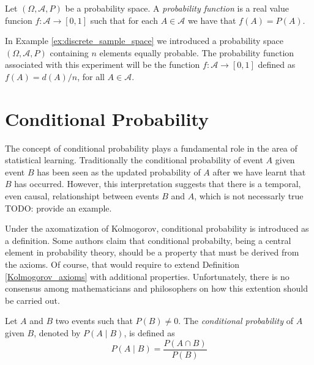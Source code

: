 \begin{definition}
\label{def:probability_function}
Let $\left( \Omega, \mathcal{A} , P \right)$ be a probability space. A \emph{probability function} is a real value funcion $f : \mathcal{A} \rightarrow [0, 1]$ such that for each $A \in \mathcal{A}$ we have that $f \left( A \right) = P \left( A \right)$.
\end{definition}

In Example \ref{ex:discrete_sample_space} we introduced a probability space $\left( \Omega, \mathcal{A}, P \right)$ containing $n$ elements equally probable. The probability function associated with this experiment will be the function $f : \mathcal{A} \rightarrow [0, 1]$ defined as $f \left( A \right) = d\left( A \right)/n$, for all $A \in \mathcal{A}$.


%
%

\section{Conditional Probability}
\label{sec:probability_conditional}

The concept of conditional probability plays a fundamental role in the area of statistical learning. Traditionally the conditional probability of event $A$ given event $B$ has been seen as the updated probability of $A$ after we have learnt that $B$ has occurred. However, this interpretation suggests that there is a temporal, even causal, relationshipt between events $B$ and $A$, which is not necessarly true {\color{red} TODO: provide an example}.

Under the axomatization of Kolmogorov, conditional probability is introduced as a definition. Some authors claim that conditional probabilty, being a central element in probability theory, should be a property that must be derived from the axioms. Of course, that would require to extend Definition \ref{Kolmogorov_axioms} with additional properties. Unfortunately, there is no consensus among mathematicians and philosophers on how this extention should be carried out.

\begin{definition}
Let $A$ and $B$ two events such that $P \left( B \right) \neq 0$. The \emph{conditional probability} of $A$ given $B$, denoted by $P \left( A \mid B \right)$, is defined as
\[
P\left(A\mid B\right) = \frac{P\left(A\cap B\right)}{P\left(B\right)}
\]
\end{definition}

